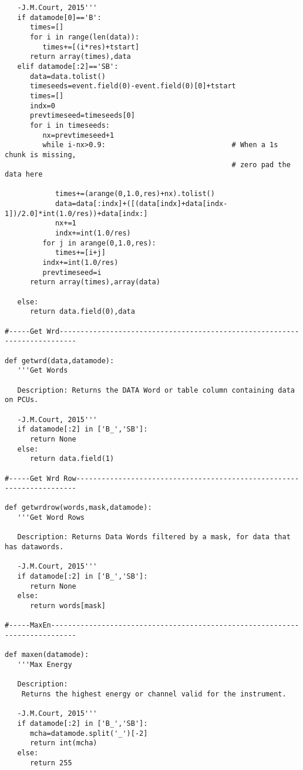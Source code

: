 \begin{verbatim}
   -J.M.Court, 2015'''
   if datamode[0]=='B':
      times=[]
      for i in range(len(data)):
         times+=[(i*res)+tstart]
      return array(times),data
   elif datamode[:2]=='SB':
      data=data.tolist()
      timeseeds=event.field(0)-event.field(0)[0]+tstart
      times=[]
      indx=0
      prevtimeseed=timeseeds[0]
      for i in timeseeds:                                                
         nx=prevtimeseed+1
         while i-nx>0.9:                              # When a 1s chunk is missing,
                                                      # zero pad the data here

            times+=(arange(0,1.0,res)+nx).tolist()
            data=data[:indx]+([(data[indx]+data[indx-1])/2.0]*int(1.0/res))+data[indx:]
            nx+=1
            indx+=int(1.0/res)
         for j in arange(0,1.0,res):
            times+=[i+j]
         indx+=int(1.0/res)
         prevtimeseed=i
      return array(times),array(data)
      
   else:
      return data.field(0),data 

#-----Get Wrd--------------------------------------------------------------------------

def getwrd(data,datamode):
   '''Get Words
   
   Description: Returns the DATA Word or table column containing data on PCUs.
   
   -J.M.Court, 2015'''
   if datamode[:2] in ['B_','SB']:
      return None
   else:
      return data.field(1)

#-----Get Wrd Row----------------------------------------------------------------------

def getwrdrow(words,mask,datamode):
   '''Get Word Rows
   
   Description: Returns Data Words filtered by a mask, for data that has datawords.
   
   -J.M.Court, 2015'''
   if datamode[:2] in ['B_','SB']:
      return None
   else:
      return words[mask]

#-----MaxEn----------------------------------------------------------------------------

def maxen(datamode):
   '''Max Energy
   
   Description:
    Returns the highest energy or channel valid for the instrument.
    
   -J.M.Court, 2015'''
   if datamode[:2] in ['B_','SB']:
      mcha=datamode.split('_')[-2]
      return int(mcha)
   else:
      return 255

\end{verbatim}

